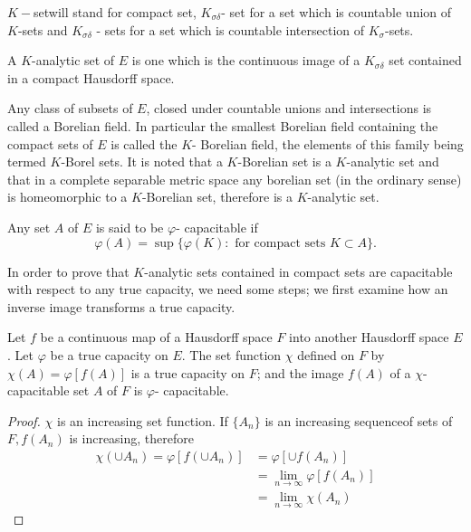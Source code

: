 $K-$set\pageoriginale will stand for compact set, $K_{\sigma \delta}$- set for a set
which is countable union of $K$-sets and $K_{\sigma \delta}$ - sets
for a set which is countable intersection of $K_{\sigma}$-sets. 

\begin{defn}\label{p2:chap1:sec1:def2}%
  A $K$-analytic set of $E$ is one which is the continuous image of a
  $K_{\sigma \delta}$ set contained in a compact Hausdorff space. 
\end{defn}

Any class of subsets of $E$, closed under countable unions and
intersections is called a Borelian field. In particular the smallest
Borelian field containing the compact sets of $E$ is called the $K$-
Borelian field, the elements of this family being termed $K$-Borel
sets. It is noted that a $K$-Borelian set is a $K$-analytic set and
that in a complete separable metric space any borelian set (in the
ordinary sense) is homeomorphic to a $K$-Borelian set, therefore is a
$K$-analytic set. 

\begin{defn} \label{p2:chap1:sec1:def3}%
  Any set $A$ of $E$ is said to be $\varphi$- capacitable if 
  $$
  \varphi(A) = \sup \{ \varphi (K): \text{ for compact sets } K
  \subset A \}. 
  $$
\end{defn}

In order to prove that $K$-analytic sets contained in compact sets are
capacitable with respect to any true capacity, we need some steps; we
first examine how an inverse image transforms a true capacity. 

\setcounter{Lemma}{0}
\begin{Lemma}\label{p2:chap1:sec1:lem1}%
  Let $f$ be a continuous map of a Hausdorff space $F$ into another
  Hausdorff space $E$. Let $\varphi$ be a true capacity on $E$. 
The set function $\chi$ defined on $F$ by $\chi (A)= \varphi [f(A)]$
is a true capacity on $F$; and the image $f(A)$ of a
$\chi$-capacitable set $A$ of $F$ is $\varphi$- capacitable. 
\end{Lemma}

\begin{proof} %
  $\chi$ is an increasing set function. If $\{ A_n \}$ is an increasing
  sequence\pageoriginale of sets of $F, f(A_n)$ is increasing, therefore 
  \begin{align*}
    \chi (\cup A_n) = \varphi[f(\cup A_n)]& = \varphi[ \cup f(A_n)]\\
    & = \lim_{n \to \infty} \varphi [f(A_n)]\\
    & = \lim_{n \to \infty} \chi (A_n)
  \end{align*}
\end{proof}

